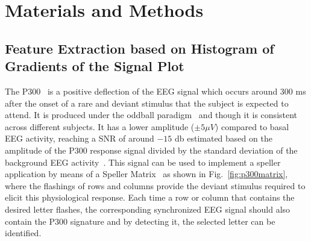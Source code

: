 \documentclass[entropy,article,submit,moreauthors,pdftex,10pt,a4paper]{mdpi}
\begin{document}
%
%
%
%
%
%
%
%

\section{Materials and Methods}

\subsection{Feature Extraction based on Histogram of Gradients of the Signal Plot} \label{Feature}

The P300~\citep{Farwell1988,Knuth2006} is a positive deflection of the EEG signal which occurs around $300$ ms after the onset of a rare and deviant stimulus that the subject is expected to attend.  It is produced under the oddball paradigm~\cite{WolpawJonathanR2012} and though it is consistent across different subjects. It has a lower amplitude  ($\pm 5 \mu V $) compared to basal EEG activity, reaching a SNR of around $-15$ db estimated based on the amplitude of the P300 response signal divided by the standard deviation of the background EEG activity~\citep{Hu2010}.  This signal can be used to implement a speller application by means of a Speller Matrix~\citep{Farwell1988} as shown in Fig.~\ref{fig:p300matrix}, where the flashings of rows and columns provide the deviant stimulus required to elicit this physiological response.   Each time a row or column that contains the desired letter flashes, the corresponding synchronized EEG signal should also contain the P300 signature and by detecting it, the selected letter can be identified.
\end{document}

